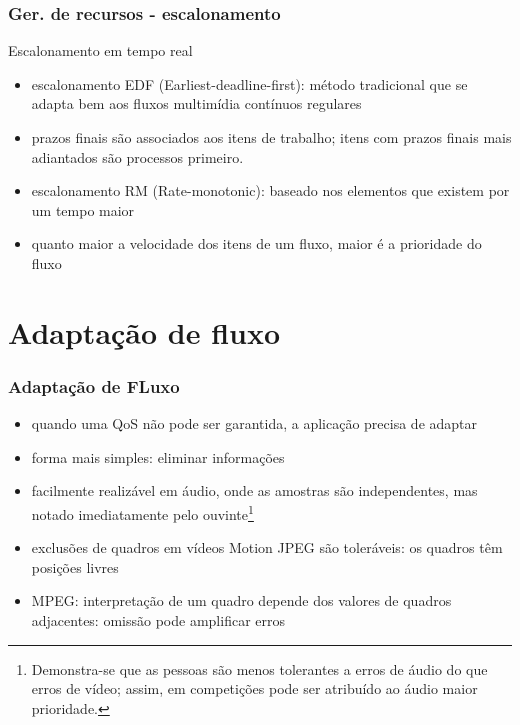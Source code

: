 \documentclass[]{beamer}
\begin{document}
\begin{frame}
  \frametitle{Ger. de recursos - escalonamento}
Escalonamento em tempo real
\begin{itemize}
  \item escalonamento EDF (Earliest-deadline-first): método tradicional que se adapta
bem aos fluxos multimídia contínuos regulares
  \item prazos finais são associados aos itens de trabalho; itens com prazos finais mais
adiantados são processos primeiro.
  \item escalonamento RM (Rate-monotonic): baseado nos elementos que existem por um tempo maior
  \item quanto maior a velocidade dos itens de um fluxo, maior é a prioridade do fluxo
\end{itemize}
\end{frame}

\section{Adaptação de fluxo}

\begin{frame}
 \frametitle{Adaptação de FLuxo}
 \begin{itemize}
   \item quando uma QoS não pode ser garantida, a aplicação precisa de adaptar
   \item forma mais simples: eliminar informações
   \item facilmente realizável em áudio, onde as amostras são independentes, mas notado
imediatamente pelo ouvinte\footnote{Demonstra-se que as pessoas são menos tolerantes a erros
de áudio do que erros de vídeo; assim, em competições pode ser atribuído ao áudio
maior prioridade.\cite{Liao:1997}}
   \item exclusões de quadros em vídeos Motion JPEG são toleráveis: os quadros têm posições livres
   \item MPEG: interpretação de um quadro depende dos valores de quadros adjacentes: omissão
pode amplificar erros
  \end{itemize}
\end{frame}
\end{document}
